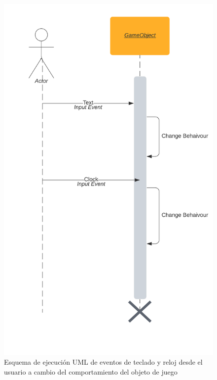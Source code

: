 \documentclass[a4paper, 17pt]{book}
\begin{document}
\begin{figure}[hbt!]
    \centering
    \includegraphics[scale=0.80, keepaspectratio]{img/UserEvent.png}
    \caption{Esquema de ejecución UML de eventos de teclado y reloj desde el usuario a cambio del comportamiento del objeto de juego}
    \label{figura:UserEvent}
\end{figure}

\end{document}
